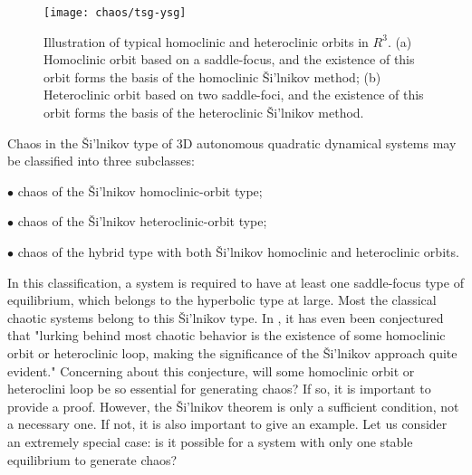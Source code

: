 \begin{figure}[h]
  \centering
  \texttt{[image: chaos/tsg-ysg]}\\
  \caption{Illustration of typical homoclinic and heteroclinic orbits in $R^3$. (a) Homoclinic orbit based on a saddle-focus, and the existence of this orbit forms  the basis of the homoclinic \v{S}i'lnikov method; (b) Heteroclinic orbit based on two saddle-foci, and the existence of this orbit forms  the basis of the heteroclinic \v{S}i'lnikov method.\cite{Shilnikov1997,Silva1993}}
\end{figure}

Chaos in the \v{S}i'lnikov type of 3D
autonomous quadratic dynamical systems may be classified into three subclasses:

$\bullet$ chaos of the \v{S}i'lnikov homoclinic-orbit type;

$\bullet$ chaos of the \v{S}i'lnikov heteroclinic-orbit type;

$\bullet$ chaos of the hybrid type with both \v{S}i'lnikov
homoclinic and heteroclinic orbits.

In this classification, a system is required to have at least one saddle-focus type of equilibrium, which belongs to the hyperbolic type at large. Most the classical chaotic systems belong to this \v{S}i'lnikov type.
In \cite{Silva1993}, it has even been conjectured that "lurking behind most chaotic behavior is the existence of some homoclinic orbit or heteroclinic loop, making the significance of the \v{S}i'lnikov approach quite evident."
Concerning about this conjecture, will some homoclinic orbit or heteroclini loop be so essential for generating chaos? If so, it is important to provide a proof. However, the \v{S}i'lnikov theorem is only a sufficient condition, not a necessary one. If not, it is also important to give an example. Let us consider an extremely special case: is it possible for a system with only one stable equilibrium to generate chaos?

